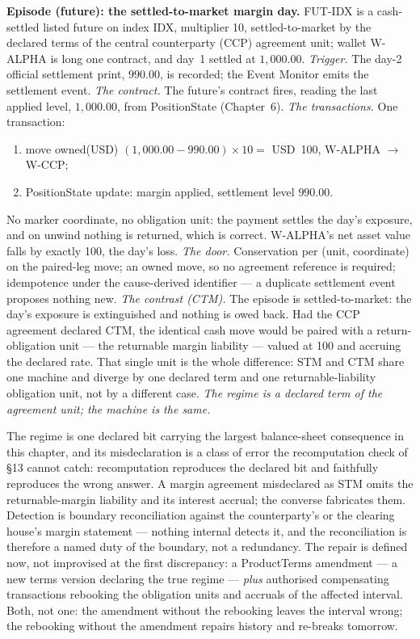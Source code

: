 \documentclass[11pt,a4paper]{article}
\newcommand{\USD}[1]{\mbox{USD~#1}}
\begin{document}
\medskip\noindent\textbf{Episode (future): the settled-to-market margin day.}
FUT-IDX is a cash-settled listed future on index IDX, multiplier 10,
settled-to-market by the declared terms of the central counterparty (CCP)
agreement unit; wallet W-ALPHA is long one contract, and day~1 settled at
$1{,}000.00$.
\emph{Trigger.} The day-2 official settlement print, $990.00$, is recorded;
the Event Monitor emits the settlement event.
\emph{The contract.} The future's contract fires, reading the last applied
level, $1{,}000.00$, from PositionState (Chapter~6).
\emph{The transactions.} One transaction:
\begin{enumerate}[label=(\arabic*),nosep]
\item move owned(USD) $(1{,}000.00-990.00)\times 10 = $ \USD{100}, W-ALPHA
$\to$ W-CCP;
\item PositionState update: margin applied, settlement level $990.00$.
\end{enumerate}
No marker coordinate, no obligation unit: the payment settles the day's
exposure, and on unwind nothing is returned, which is correct. W-ALPHA's net
asset value falls by exactly 100, the day's loss.
\emph{The door.} Conservation per (unit, coordinate) on the paired-leg move;
an owned move, so no agreement reference is required; idempotence under the
cause-derived identifier --- a duplicate settlement event proposes nothing
new.
\emph{The contrast (CTM).} The episode is settled-to-market: the day's exposure is
extinguished and nothing is owed back. Had the CCP agreement declared CTM, the
identical cash move would be paired with a return-obligation unit --- the returnable
margin liability --- valued at 100 and accruing the declared rate. That single unit is
the whole difference: STM and CTM share one machine and diverge by one declared term
and one returnable-liability obligation unit, not by a different case.
\emph{The regime is a declared term of the agreement unit; the machine is the
same.}

\medskip
The regime is one declared bit carrying the largest balance-sheet consequence
in this chapter, and its misdeclaration is a class of error the recomputation
check of \S13 cannot catch: recomputation reproduces the declared bit and
faithfully reproduces the wrong answer. A margin agreement misdeclared as STM
omits the returnable-margin liability and its interest accrual; the converse
fabricates them. Detection is boundary reconciliation against the
counterparty's or the clearing house's margin statement --- nothing internal
detects it, and the reconciliation is therefore a named duty of the boundary,
not a redundancy. The repair is defined now, not improvised at the first
discrepancy: a ProductTerms amendment --- a new terms version declaring the
true regime --- \emph{plus} authorised compensating transactions rebooking the obligation
units and accruals of the affected interval. Both, not one: the amendment
without the rebooking leaves the interval wrong; the rebooking without the
amendment repairs history and re-breaks tomorrow.
\end{document}
